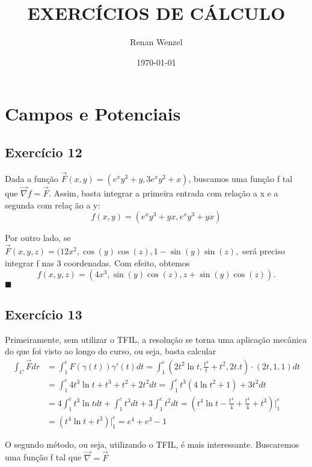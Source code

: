 \documentclass{article}
\title{EXERC\'ICIOS DE C\'ALCULO}
\author{Renan Wenzel}
\date{\today}
\renewcommand\qedsymbol{$\blacksquare$}
\begin{document}
\maketitle

\section*{Campos e Potenciais}
\subsection{Exerc\'icio 12}
Dada a fun\c c\~ao $\vec{F}(x, y) = (e^{x}y ^{3} + y, 3e^{x}y^2 + x)$, buscamos uma fun\c c\~ao f tal que 
$\vec{\nabla}{f} = \vec{F}$. Assim, basta integrar a primeira entrada com rela\c c\~ao a x e a segunda com rela\c c
\~ao a y:
  $$
  f(x, y) = (e^{x}y ^{3} + yx, e^{x}y^3 + yx)
  $$

  Por outro lado, se $\vec{F}(x, y, z) = (12x^2, \cos(y)\cos(z), 1 - \sin(y)\sin(z),$ ser\'a preciso integrar f
nas 3 coordenadas. Com efeito, obtemos
  $$
  f(x, y, z) = (4x ^{3}, \sin(y)\cos(z), z + \sin(y)\cos(z)).
  $$
\qedsymbol

\subsection{Exerc\'icio 13}
Primeiramente, sem utilizar o TFIL, a resolu\c c\~ao se torna uma aplica\c c\~ao mec\^anica do que foi visto ao longo
do curso, ou seja, basta calcular
\begin{align*}
  \int_{C}\vec{F}\dot{}dr & = \int_{1}^{e} F(\gamma(t))\gamma'(t)dt = \int_{1}^{e}(2t^2\ln{t}, \frac{t ^{4}}{t} + t ^{2}, 2t.t)\cdot{}
  (2t, 1, 1)dt \\ 
  & =\int_{1}^{e}4t^3\ln{t} + t^3 + t^2 + 2t^2dt = \int_{1}^{e}t^3(4\ln{t^2} + 1) + 3t^2dt\\
  & =4\int_{1}^{e}t^3\ln{t}dt + \int_{1}^{e}t^3dt + 3\int_{1}^{e}t^2dt = (t^4\ln{t} - \frac{t^4}{4} + \frac{t ^{4}}{4} + t^3)\bigg|_{1}^{e} \\
  & =(t^4\ln{t} + t^3)\bigg|_{1}^{e} = e^{4} + e^{3} - 1 
\end{align*}

O segundo m\'etodo, ou seja, utilizando o TFIL, \'e mais interessante. Buscaremos uma fun\c c\~ao f tal que $\vec{\nabla}=\vec{F}$
\end{document}
